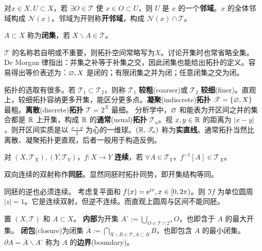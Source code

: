 \begin{definition}
    对$x\in X,U\subset X$，若 $\exists O\in\mathscr{T}$ 使 $x\in O\subset U$，则 $U$ 是 $x$ 的一个\textbf{邻域}。$x$ 的全体邻域构成 $\mathscr N(x)$。邻域为开则称\textbf{开邻域}，构成 $\mathscr N(x)\cap\mathscr T$。
\end{definition}

\begin{definition}
    $A\subset X$ 称为\textbf{闭集}，若 $X\backslash A\in\mathscr{T}$。
\end{definition}

$\mathscr T$ 的名称若自明或不重要，则拓扑空间常略写为$X$。讨论开集时也常省略全集。De Morgan 律指出：并集之补等于补集之交，因此闭集也能给出拓扑的定义。容易得出等价表述为：$\varnothing,X$ 是闭的；有限闭集之并为闭；任意闭集之交为闭。

拓扑的选取有很多。若 $\mathscr T_1\subset\mathscr T_2$，则称 $\mathscr T_1$ \textbf{较粗}(coarser)或 $\mathscr T_2$ \textbf{较细}(finer)。直观上，较细拓扑容纳更多开集，能区分更多点。\textbf{凝聚}(indiscrete)\textbf{拓扑} $\mathscr T=\{\varnothing,X\}$ 最粗。\textbf{离散}(discrete)\textbf{拓扑} $\mathscr T= 2^X$ 最细。
分析学中，$\varnothing$ 和能表为开区间之并的集合都是 $\mathbb{R}$ 上开集，构成 $\mathbb{R}$ 的\textbf{通常}(usual)\textbf{拓扑} $\mathscr T_u$。视 $x,y\in\mathbb{R}$ 的距离为 $|x-y|$，则开区间实质是以 $\frac{x+y}{2}$ 为心的一维球。$(\mathbb{R},\mathscr T_u)$ 称为\textbf{实直线}。通常拓扑当然比离散、凝聚拓扑更直观，后者一般用于构造反例。

\begin{definition}
    对 $(X,\mathscr T_X),(Y,\mathscr T_Y)$，$f: X \to Y$ \textbf{连续}，若 $\forall A\in\mathscr T_Y$，$f^{-1}[A]\in \mathscr T_X$。
\end{definition}

\begin{definition}
    双向连续的双射称作\textbf{同胚}。显然同胚时拓扑同势，即开集结构等同。
\end{definition}

\begin{remark}
    同胚的逆也必须连续。
    考虑复平面和 $f(x)=\mathrm{e}^{\mathrm{i} x},x\in [0,2\pi)$。则 $\Im f$ 为单位圆周 $|z|=1$。它是连续双射，但逆不连续。而直观上圆周与区间不能同胚。
\end{remark}

\begin{definition}
置 $(X,\mathscr T)$ 和 $A\subset X$。
\textbf{内部}为开集 $A^\circ:=\bigcup_{O\in\mathscr T\cap 2^A} O$，也即含于 $A$ 的最大开集。
\textbf{闭包}(closure)为闭集 $\bar{A}:=\bigcap_{X\backslash B\in\mathscr T,A\subset B} B$，也即包含 $A$ 的最小闭集。
$\partial A=\bar{A}\backslash A^\circ$ 称为 $A$ 的\textbf{边界}(boundary)。
\end{definition}


